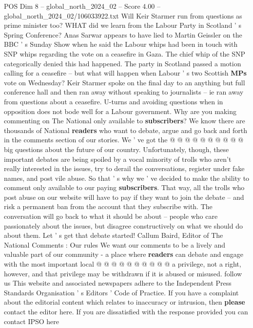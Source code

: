 \begin{textsample}{POS Dim 8 – global\_north\_2024\_02 – Score 4.00 – global\_north\_2024\_02/106033922.txt}  \label{ex:f8_pos_212}
Will Keir Starmer run from questions as prime minister too?
WHAT did we learn from the Labour Party in Scotland ' s Spring Conference?
Anas Sarwar appears to have lied to Martin Geissler on the BBC ' s Sunday Show when he said the Labour whips had been in touch with SNP whips regarding the vote on a ceasefire in Gaza.
The chief whip of the SNP categorically denied this had happened.
The party in Scotland passed a motion calling for a ceasefire -- but what will happen when Labour ' s two Scottish \textbf{MPs} vote on Wednesday?
Keir Starmer spoke on the final day to an anything but full conference hall and then ran away without speaking to journalists -- ie ran away from questions about a ceasefire.
U-turns and avoiding questions when in opposition does not bode well for a Labour government.
Why are you making commenting on The National only available to \textbf{subscribers}?
We know there are thousands of National \textbf{readers} who want to debate, argue and go back and forth in the comments section of our stories.
We ' ve got the @ @ @ @ @ @ @ @ @ @ big questions about the future of our country.
Unfortunately, though, these important debates are being spoiled by a vocal minority of trolls who aren't really interested in the issues, try to derail the conversations, register under fake names, and post vile abuse.
So that ' s why we ' ve decided to make the ability to comment only available to our paying \textbf{subscribers}.
That way, all the trolls who post abuse on our website will have to pay if they want to join the debate -- and risk a permanent ban from the account that they subscribe with.
The conversation will go back to what it should be about -- people who care passionately about the issues, but disagree constructively on what we should do about them.
Let ' s get that debate started!
Callum Baird, Editor of The National Comments : Our rules We want our comments to be a lively and valuable part of our community - a place where \textbf{readers} can debate and engage with the most important local @ @ @ @ @ @ @ @ @ @ a privilege, not a right, however, and that privilege may be withdrawn if it is abused or misused. follow us This website and associated newspapers adhere to the Independent Press Standards Organisation ' s Editors ' Code of Practice.
If you have a complaint about the editorial content which relates to inaccuracy or intrusion, then \textbf{please} contact the editor here.
If you are dissatisfied with the response provided you can contact IPSO here

\end{textsample}
